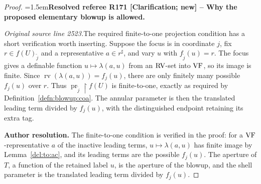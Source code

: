 \documentclass[12pt]{amsart}
\newcommand{\ResolvedRefereeRemark}[5]{%
  \par\medskip\begingroup\normalfont\small\color{gray}%
  \emergencystretch=1.5em\noindent\textbf{Resolved referee R#1 [#2] -- #3.}\par\nobreak\noindent #4\par
  \medskip\color{ResolutionGreen}\noindent\textbf{Author resolution.} #5\par
  \endgroup\medskip
}
\theoremstyle{plain}
\theoremstyle{definition}
\theoremstyle{remark}
\numberwithin{equation}{section}
\theoremstyle{plain}
\newcommand{\VF}{\textup{VF}}
\newcommand{\RV}{\textup{RV}}
\DeclareMathOperator{\pr}{pr}
\newcommand{\0}{\emptyset}
\newcommand{\rest}{\upharpoonright}
\DeclareMathOperator{\rv}{rv}
\begin{document}
\begin{proof}
\ResolvedRefereeRemark{171}{Clarification; new}{Why the proposed elementary blowup is allowed}{%
\textit{Original source line 2523.}\quad The required finite-to-one projection condition has a short verification worth inserting. Suppose the focus is in coordinate $j$, fix $r\in f(U)_{\tilde j}$ and a representative $a\in r^\sharp$, and vary $u$ with $f_{\tilde j}(u)=r$. The focus gives a definable function $u\mapsto\lambda(a,u)$ from an $\RV$-set into $\VF$, so its image is finite. Since $\rv(\lambda(a,u))=f_j(u)$, there are only finitely many possible $f_j(u)$ over $r$. Thus $\pr_{\tilde j}\rest f(U)$ is finite-to-one, exactly as required by Definition~\ref{defn:blowup:coa}. The annular parameter is then the translated leading term divided by $f_j(u)$, with the distinguished endpoint retaining its extra tag.
}{The finite-to-one condition is verified in the proof: for a $\VF$-representative $a$ of the inactive leading terms, $u\mapsto\lambda(a,u)$ has finite image by Lemma~\ref{dcl:to:ac}, and its leading terms are the possible $f_j(u)$. The aperture of $T$, a function of the retained label $u$, is the aperture of the blowup, and the shell parameter is the translated leading term divided by $f_j(u)$.}
\end{proof}
\end{document}

